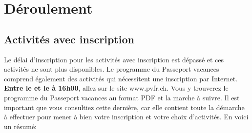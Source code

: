 \section*{Déroulement}

\subsection*{Activités avec inscription}

Le délai d'inscription pour les activités avec inscription est dépassé et ces activités ne sont plus disponibles.
Le programme du Passeport vacances comprend également des activités qui nécessitent une inscription par Internet.
\textbf{Entre le  et le   à 16h00}, allez
sur le site www.pvfr.ch. Vous y trouverez le programme du
Passeport vacances  au format PDF et la marche à suivre. Il est important que vous consultiez cette dernière, car
elle contient toute la démarche à effectuer pour mener à bien votre inscription et votre choix d'activités. En voici
un résumé:

